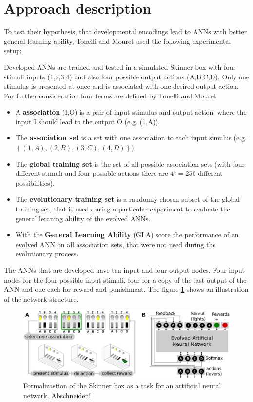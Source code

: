 \documentclass[12pt,twoside]{article}
\theoremstyle{plain}
\theoremstyle{definition}
\theoremstyle{remark}
\begin{document}
\section{Approach description}
\label{sec:model}
To test their hypothesis, that developmental encodings lead to ANNs with better general learning ability, Tonelli and Mouret used the following experimental setup:\medskip

Developed ANNs are trained and tested in a simulated Skinner box with four stimuli inputs (1,2,3,4) and also four possible output actions (A,B,C,D). Only one stimulus is presented at once and is associated with one desired output action.
For further consideration four terms are defined by Tonelli and Mouret:
\begin{itemize}
	\item A \textbf{association} (I,O) is a pair of input stimulus and output action, where the input I should lead to the output O (e.g. (1,A)).
	\item The \textbf{association set} is a set with one association to each input simulus (e.g. $\left\{(1,A),(2,B),(3,C),(4,D)\right\})$
	\item The \textbf{global training set} is the set of all possible association sets (with four different stimuli and four possible actions there are $4^4 = 256$ different possibilities).
	\item The \textbf{evolutionary training set} is a randomly chosen subset of the global training set, that is used during a particular experiment to evaluate the general leraning ability of the evolved ANNs.
	\item With the \textbf{General Learning Ability} (GLA) score the performance of an evolved ANN on all association sets, that were not used during the evolutionary process.
\end{itemize}

The ANNs that are developed have ten input and four output nodes. Four input nodes for the four possible input stimuli, four for a copy of the last output of the ANN and one each for reward and punishment.
The figure \ref{fig:formalization} shows an illustration of the network structure.

\begin{figure}[h]
	\begin{center}
		\includegraphics[width=.9\textwidth]{network_structure.png}
	\end{center}
	\caption{Formalizastion of the Skinner box as a task for an artificial neural network. Abschneiden!}
	\label{fig:formalization}
\end{figure}
\end{document}
